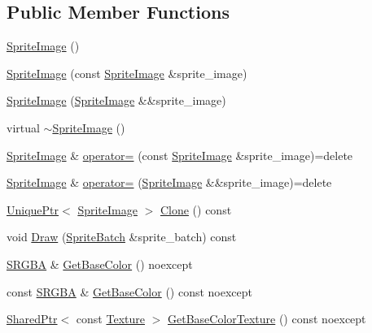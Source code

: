 \subsection*{Public Member Functions}
\begin{DoxyCompactItemize}
\item 
\hyperlink{classmage_1_1_sprite_image_ac5de26e66bf1d1fdd255c2044f097ecf}{Sprite\+Image} ()
\item 
\hyperlink{classmage_1_1_sprite_image_a7ce3b568dc3ff96e7467a8d00bba997d}{Sprite\+Image} (const \hyperlink{classmage_1_1_sprite_image}{Sprite\+Image} \&sprite\+\_\+image)
\item 
\hyperlink{classmage_1_1_sprite_image_ae1ea5c900498c8ecdf5dd3131d056dd5}{Sprite\+Image} (\hyperlink{classmage_1_1_sprite_image}{Sprite\+Image} \&\&sprite\+\_\+image)
\item 
virtual \hyperlink{classmage_1_1_sprite_image_a9121ee110f7e64ee6e936e0d3350ab44}{$\sim$\+Sprite\+Image} ()
\item 
\hyperlink{classmage_1_1_sprite_image}{Sprite\+Image} \& \hyperlink{classmage_1_1_sprite_image_a20d8e8272cf62599f6c0e4b1ff4f3586}{operator=} (const \hyperlink{classmage_1_1_sprite_image}{Sprite\+Image} \&sprite\+\_\+image)=delete
\item 
\hyperlink{classmage_1_1_sprite_image}{Sprite\+Image} \& \hyperlink{classmage_1_1_sprite_image_a9f83e728a93550f6b20bb4d500483171}{operator=} (\hyperlink{classmage_1_1_sprite_image}{Sprite\+Image} \&\&sprite\+\_\+image)=delete
\item 
\hyperlink{namespacemage_a3316d7143a973e37adf1110f2e80ca31}{Unique\+Ptr}$<$ \hyperlink{classmage_1_1_sprite_image}{Sprite\+Image} $>$ \hyperlink{classmage_1_1_sprite_image_a19db9a2a418dd04db0b38d1f8aa7e035}{Clone} () const
\item 
void \hyperlink{classmage_1_1_sprite_image_ae30d3293931f674fea17008063755bb6}{Draw} (\hyperlink{classmage_1_1_sprite_batch}{Sprite\+Batch} \&sprite\+\_\+batch) const
\item 
\hyperlink{structmage_1_1_s_r_g_b_a}{S\+R\+G\+BA} \& \hyperlink{classmage_1_1_sprite_image_a0362a937253ba7a5cd944210aafd9288}{Get\+Base\+Color} () noexcept
\item 
const \hyperlink{structmage_1_1_s_r_g_b_a}{S\+R\+G\+BA} \& \hyperlink{classmage_1_1_sprite_image_a72e5087fc7f6bc1668980c5c35815906}{Get\+Base\+Color} () const noexcept
\item 
\hyperlink{namespacemage_a1e01ae66713838a7a67d30e44c67703e}{Shared\+Ptr}$<$ const \hyperlink{classmage_1_1_texture}{Texture} $>$ \hyperlink{classmage_1_1_sprite_image_a7fa3f86018f033288c755a665ee90bc2}{Get\+Base\+Color\+Texture} () const noexcept

\end{DoxyCompactItemize}
